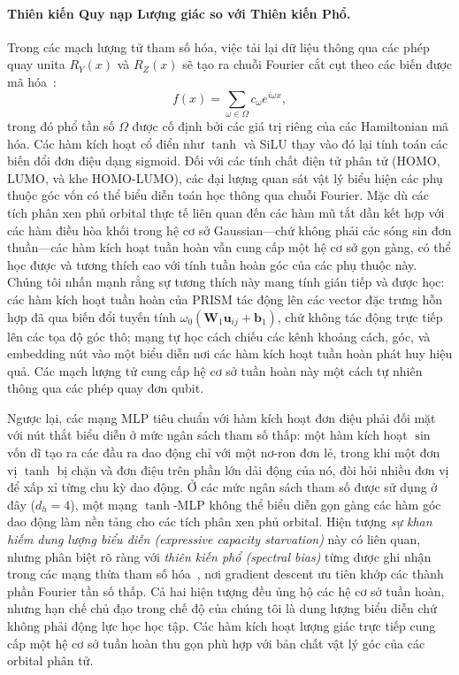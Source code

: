 \documentclass[10pt,twocolumn,letterpaper]{article}
\begin{document}
\paragraph{Thiên kiến Quy nạp Lượng giác so với Thiên kiến Phổ.}
Trong các mạch lượng tử tham số hóa, việc tải lại dữ liệu thông qua các phép quay unita $R_Y(x)$ và $R_Z(x)$ sẽ tạo ra chuỗi Fourier cắt cụt theo các biến được mã hóa~\cite{Schuld:2020enb, Perez-Salinas:2019pjx, landman2023approximating}:
\begin{equation}
    f(x) = \sum_{\omega \in \Omega} c_\omega e^{i\omega x},
\end{equation}
trong đó phổ tần số $\Omega$ được cố định bởi các giá trị riêng của các Hamiltonian mã hóa. Các hàm kích hoạt cổ điển như $\tanh$ và SiLU thay vào đó lại tính toán các biến đổi đơn điệu dạng sigmoid. Đối với các tính chất điện tử phân tử (HOMO, LUMO, và khe HOMO-LUMO), các đại lượng quan sát vật lý biểu hiện các phụ thuộc góc vốn có thể biểu diễn toán học thông qua chuỗi Fourier. Mặc dù các tích phân xen phủ orbital thực tế liên quan đến các hàm mũ tắt dần kết hợp với các hàm điều hòa khối trong hệ cơ sở Gaussian---chứ không phải các sóng sin đơn thuần---các hàm kích hoạt tuần hoàn vẫn cung cấp một hệ cơ sở gọn gàng, có thể học được và tương thích cao với tính tuần hoàn góc của các phụ thuộc này. Chúng tôi nhấn mạnh rằng sự tương thích này mang tính gián tiếp và được học: các hàm kích hoạt tuần hoàn của PRISM tác động lên các vector đặc trưng hỗn hợp đã qua biến đổi tuyến tính $\omega_0(\mathbf{W}_1 \mathbf{u}_{ij} + \mathbf{b}_1)$, chứ không tác động trực tiếp lên các tọa độ góc thô; mạng tự học cách chiếu các kênh khoảng cách, góc, và embedding nút vào một biểu diễn nơi các hàm kích hoạt tuần hoàn phát huy hiệu quả. Các mạch lượng tử cung cấp hệ cơ sở tuần hoàn này một cách tự nhiên thông qua các phép quay đơn qubit.

Ngược lại, các mạng MLP tiêu chuẩn với hàm kích hoạt đơn điệu phải đối mặt với nút thắt biểu diễn ở mức ngân sách tham số thấp: một hàm kích hoạt $\sin$ vốn dĩ tạo ra các đầu ra dao động chỉ với một nơ-ron đơn lẻ, trong khi một đơn vị $\tanh$ bị chặn và đơn điệu trên phần lớn dải động của nó, đòi hỏi nhiều đơn vị để xấp xỉ từng chu kỳ dao động. Ở các mức ngân sách tham số được sử dụng ở đây ($d_h = 4$), một mạng $\tanh$-MLP không thể biểu diễn gọn gàng các hàm góc dao động làm nền tảng cho các tích phân xen phủ orbital. Hiện tượng \textit{sự khan hiếm dung lượng biểu diễn (expressive capacity starvation)} này có liên quan, nhưng phân biệt rõ ràng với \textit{thiên kiến phổ (spectral bias)} từng được ghi nhận trong các mạng thừa tham số hóa~\cite{rahaman2019spectral, tancik2020fourier}, nơi gradient descent ưu tiên khớp các thành phần Fourier tần số thấp. Cả hai hiện tượng đều ủng hộ các hệ cơ sở tuần hoàn, nhưng hạn chế chủ đạo trong chế độ của chúng tôi là dung lượng biểu diễn chứ không phải động lực học học tập. Các hàm kích hoạt lượng giác trực tiếp cung cấp một hệ cơ sở tuần hoàn thu gọn phù hợp với bản chất vật lý góc của các orbital phân tử.
\end{document}
